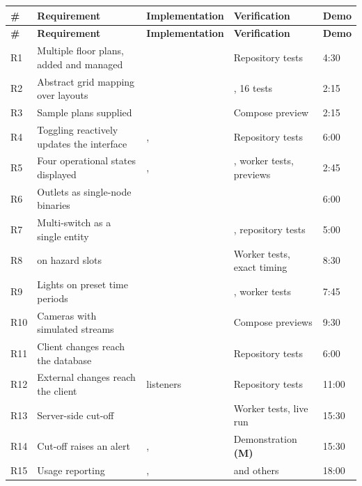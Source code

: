 \documentclass[11pt,a4paper]{article}
\begin{document}
\begin{longtable}{@{}L{0.8cm}L{4.6cm}L{4.2cm}L{3.1cm}L{1.1cm}@{}}
\toprule
\textbf{\#} & \textbf{Requirement} & \textbf{Implementation} & \textbf{Verification} & \textbf{Demo} \\
\midrule
\endfirsthead
\toprule
\textbf{\#} & \textbf{Requirement} & \textbf{Implementation} & \textbf{Verification} & \textbf{Demo} \\
\midrule
\endhead
R1  & Multiple floor plans, added and managed &  & Repository tests & 4:30 \\
R2  & Abstract grid mapping over layouts &  & , 16 tests & 2:15 \\
R3  & Sample plans supplied &  & Compose preview & 2:15 \\
R4  & Toggling reactively updates the interface & ,  & Repository tests & 6:00 \\
R5  & Four operational states displayed & ,  & , worker tests, previews & 2:45 \\
R6  & Outlets as single-node binaries &  &  & 6:00 \\
R7  & Multi-switch as a single entity &  & , repository tests & 5:00 \\
R8  &  on hazard slots &  & Worker tests, exact timing & 8:30 \\
R9  & Lights on preset time periods &  & , worker tests & 7:45 \\
R10 & Cameras with simulated streams &  & Compose previews & 9:30 \\
R11 & Client changes reach the database &  & Repository tests & 6:00 \\
R12 & External changes reach the client &  listeners & Repository tests & 11:00 \\
R13 & Server-side cut-off &  & Worker tests, live run & 15:30 \\
R14 & Cut-off raises an alert & ,  & Demonstration \textbf{(M)} & 15:30 \\
R15 & Usage reporting & ,  &  and others & 18:00 \\

\end{longtable}
\end{document}
